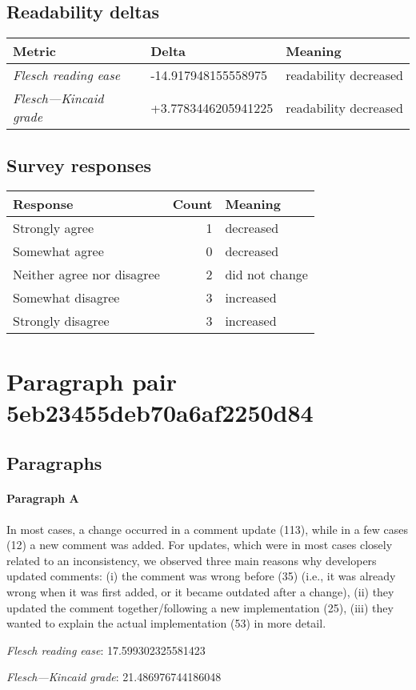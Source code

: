\subsection{Readability deltas}

\begin{tabular}{lll}
\toprule
               \textbf{Metric} &       \textbf{Delta} &       \textbf{Meaning} \\
\midrule
    \emph{Flesch reading ease} &  -14.917948155558975 &  readability decreased \\
 \emph{Flesch---Kincaid grade} &  +3.7783446205941225 &  readability decreased \\
\bottomrule
\end{tabular}

\subsection{Survey responses}
\begin{tabular}{lrl}
\toprule
          \textbf{Response} &  \textbf{Count} & \textbf{Meaning} \\
\midrule
             Strongly agree &               1 &        decreased \\
             Somewhat agree &               0 &        decreased \\
 Neither agree nor disagree &               2 &   did not change \\
          Somewhat disagree &               3 &        increased \\
          Strongly disagree &               3 &        increased \\
\bottomrule
\end{tabular}

\section{Paragraph pair 5eb23455deb70a6af2250d84}
\subsection{Paragraphs}
\paragraph{Paragraph A}
In most cases, a change occurred in a comment update (113), while in a few cases (12) a new comment was added. For updates, which were in most cases closely related to an inconsistency, we observed three main reasons why developers updated comments: (i) the comment was wrong before (35) (i.e., it was already wrong when it was first added, or it became outdated after a change), (ii) they updated the comment together/following a new implementation (25), (iii) they wanted to explain the actual implementation (53) in more detail.\par\medskip\emph{Flesch reading ease}: 17.599302325581423\par\emph{Flesch---Kincaid grade}: 21.486976744186048

